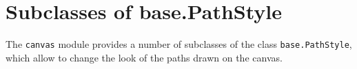 \section{Subclasses of base.PathStyle}

The \verb|canvas| module provides a number of subclasses of the class
\verb|base.PathStyle|, which allow to change the look of the paths
drawn on the canvas.





